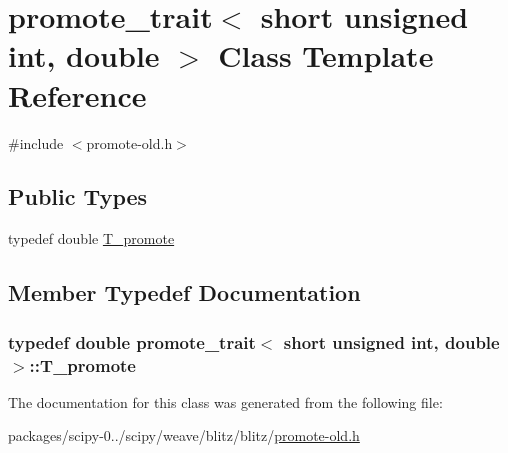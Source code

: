 \hypertarget{classpromote__trait_3_01short_01unsigned_01int_00_01double_01_4}{}\section{promote\+\_\+trait$<$ short unsigned int, double $>$ Class Template Reference}
\label{classpromote__trait_3_01short_01unsigned_01int_00_01double_01_4}


{\ttfamily \#include $<$promote-\/old.\+h$>$}

\subsection*{Public Types}
\begin{DoxyCompactItemize}
\item 
typedef double \hyperlink{classpromote__trait_3_01short_01unsigned_01int_00_01double_01_4_a14be50c852c249e8f79fffd08e5e0271}{T\+\_\+promote}
\end{DoxyCompactItemize}


\subsection{Member Typedef Documentation}
\hypertarget{classpromote__trait_3_01short_01unsigned_01int_00_01double_01_4_a14be50c852c249e8f79fffd08e5e0271}{}
\subsubsection[{T\+\_\+promote}]{\setlength{\rightskip}{0pt plus 5cm}typedef double {\bf promote\+\_\+trait}$<$ short unsigned int, double $>$\+::{\bf T\+\_\+promote}}\label{classpromote__trait_3_01short_01unsigned_01int_00_01double_01_4_a14be50c852c249e8f79fffd08e5e0271}


The documentation for this class was generated from the following file\+:\begin{DoxyCompactItemize}
\item 
packages/scipy-\/0../scipy/weave/blitz/blitz/\hyperlink{promote-old_8h}{promote-\/old.\+h}\end{DoxyCompactItemize}
